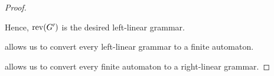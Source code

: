 \begin{proof}
\begin{itemize}
    Hence, \( \operatorname{rev}(G') \) is the desired left-linear grammar.
  \end{itemize}

    allows us to convert every left-linear grammar to a finite automaton.

    allows us to convert every finite automaton to a right-linear grammar.
\end{proof}
